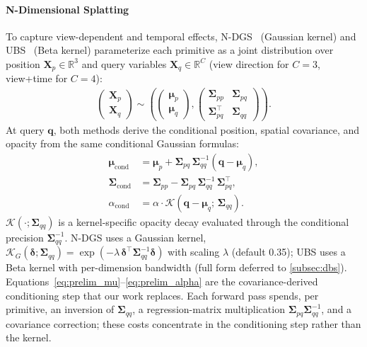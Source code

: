 \documentclass{article}
\theoremstyle{plain}
\theoremstyle{definition}
\theoremstyle{remark}
\begin{document}
\paragraph{N-Dimensional Splatting}
To capture view-dependent and temporal effects, N-DGS~\citep{gao20246dgs,gao20257dgs} (Gaussian kernel) and UBS~\citep{liu2025universal} (Beta kernel) parameterize each primitive as a joint distribution over position $\mathbf{X}_p\in\mathbb{R}^3$ and query variables $\mathbf{X}_q\in\mathbb{R}^C$ (view direction for $C=3$, view+time for $C=4$):
\begin{align}
\begin{pmatrix} \mathbf{X}_p \\ \mathbf{X}_q \end{pmatrix} \sim \left(
\begin{pmatrix}
\boldsymbol{\mu}_p \\ \boldsymbol{\mu}_q
\end{pmatrix},
\begin{pmatrix}
\boldsymbol{\Sigma}_{pp} & \boldsymbol{\Sigma}_{pq} \\
\boldsymbol{\Sigma}_{pq}^\top & \boldsymbol{\Sigma}_{qq}
\end{pmatrix}
\right).
\end{align}
At query $\mathbf{q}$, both methods derive the conditional position, spatial covariance, and opacity from the same conditional Gaussian formulas:
\begin{align}
\boldsymbol{\mu}_{\text{cond}} &= \boldsymbol{\mu}_p + \boldsymbol{\Sigma}_{pq}\,\boldsymbol{\Sigma}_{qq}^{-1}(\mathbf{q}-\boldsymbol{\mu}_q), \label{eq:prelim_mu}\\
\boldsymbol{\Sigma}_{\text{cond}} &= \boldsymbol{\Sigma}_{pp} - \boldsymbol{\Sigma}_{pq}\,\boldsymbol{\Sigma}_{qq}^{-1}\,\boldsymbol{\Sigma}_{pq}^\top, \label{eq:prelim_sigma}\\
\alpha_{\text{cond}} &= \alpha \cdot \mathcal{K}\!\left(\mathbf{q}-\boldsymbol{\mu}_q;\,\boldsymbol{\Sigma}_{qq}\right). \label{eq:prelim_alpha}
\end{align}
$\mathcal{K}(\cdot;\boldsymbol{\Sigma}_{qq})$ is a kernel-specific opacity decay evaluated through the conditional precision $\boldsymbol{\Sigma}_{qq}^{-1}$. N-DGS uses a Gaussian kernel, $\mathcal{K}_{G}(\boldsymbol{\delta};\boldsymbol{\Sigma}_{qq}) = \exp(-\lambda\,\boldsymbol{\delta}^\top \boldsymbol{\Sigma}_{qq}^{-1}\boldsymbol{\delta})$ with scaling $\lambda$ (default 0.35); UBS uses a Beta kernel with per-dimension bandwidth (full form deferred to \cref{subsec:dbs}). Equations~\eqref{eq:prelim_mu}--\eqref{eq:prelim_alpha} are the covariance-derived conditioning step that our work replaces. Each forward pass spends, per primitive, an inversion of $\boldsymbol{\Sigma}_{qq}$, a regression-matrix multiplication $\boldsymbol{\Sigma}_{pq}\boldsymbol{\Sigma}_{qq}^{-1}$, and a covariance correction; these costs concentrate in the conditioning step rather than the kernel.
\end{document}
